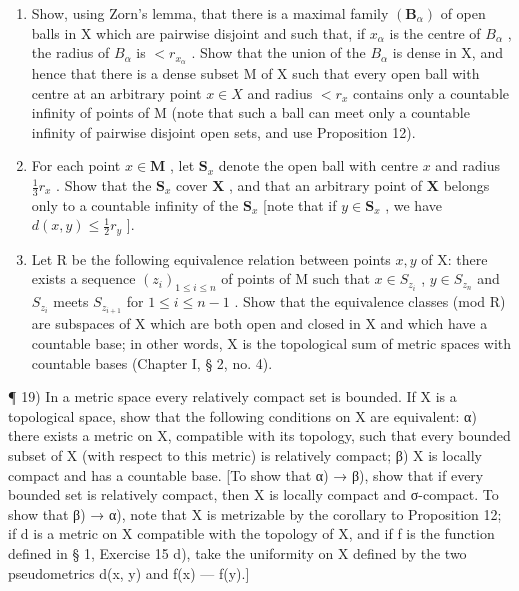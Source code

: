 \begin{enumerate}
\def\labelenumi{\alph{enumi})}
\item
  Show, using Zorn's lemma, that there is a maximal family \((\mathbf{B}_{\alpha})\) of open balls in X which are pairwise disjoint and such that, if \(x_{\alpha}\) is the centre of \(B_{\alpha}\) , the radius of \(B_{\alpha}\) is \(<r_{x_{\alpha}}\) . Show that the union of the \(B_{\alpha}\) is dense in X, and hence that there is a dense subset M of X such that every open ball with centre at an arbitrary point \(x \in X\) and radius \(<r_{x}\) contains only a countable infinity of points of M (note that such a ball can meet only a countable infinity of pairwise disjoint open sets, and use Proposition 12).
\item
  For each point \(x \in \mathbf{M}\) , let \(\mathbf{S}_x\) denote the open ball with centre \(x\) and radius \(\frac{1}{3} r_x\) . Show that the \(\mathbf{S}_x\) cover \(\mathbf{X}\) , and that an arbitrary point of \(\mathbf{X}\) belongs only to a countable infinity of the \(\mathbf{S}_x\) {[}note that if \(y \in \mathbf{S}_x\) , we have \(d(x, y) \leqslant \frac{1}{2} r_y\) {]}.
\item
  Let R be the following equivalence relation between points \(x, y\) of X: there exists a sequence \((z_i)_{1 \leqslant i \leqslant n}\) of points of M such that \(x \in S_{z_i}\) , \(y \in S_{z_n}\) and \(S_{z_i}\) meets \(S_{z_{i+1}}\) for \(1 \leqslant i \leqslant n - 1\) . Show that the equivalence classes (mod R) are subspaces of X which are both open and closed in X and which have a countable base; in other words, X is the topological sum of metric spaces with countable bases (Chapter I, § 2, no. 4).
\end{enumerate}

¶ 19) In a metric space every relatively compact set is bounded. If X is a topological space, show that the following conditions on X are equivalent: α) there exists a metric on X, compatible with its topology, such that every bounded subset of X (with respect to this metric) is relatively compact; β) X is locally compact and has a countable base. {[}To show that α) → β), show that if every bounded set is relatively compact, then X is locally compact and σ-compact. To show that β) → α), note that X is metrizable by the corollary to Proposition 12; if d is a metric on X compatible with the topology of X, and if f is the function defined in § 1, Exercise 15 d), take the uniformity on X defined by the two pseudometrics d(x, y) and \textbar f(x) --- f(y)\textbar.{]}

